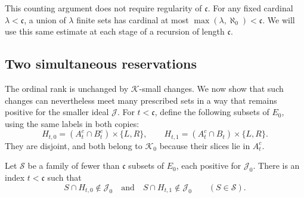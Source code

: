 This counting argument does not require regularity of
$\mathfrak c$. For any fixed cardinal $\lambda<\mathfrak c$, a union
of $\lambda$ finite sets has cardinal at most
$\max(\lambda,\aleph_0)<\mathfrak c$. We will use this same estimate
at each stage of a recursion of length $\mathfrak c$.

\subsection{Two simultaneous reservations}

The ordinal rank is unchanged by $\mathcal K$-small changes. We now
show that such changes can nevertheless meet many prescribed sets
in a way that remains positive for the smaller ideal $\mathcal J$.
For $t<\mathfrak c$, define the following subsets of $E_0$, using the
same labels in both copies:
\[
 H_{t,0}=(A_t^c\cap B_t^c)\times\{L,R\},\qquad
 H_{t,1}=(A_t^c\cap B_t)\times\{L,R\}.
\]
They are disjoint, and both belong to $\mathcal K_0$ because their
slices lie in $A_t^c$.

\begin{lemma}\label{lem:reservations}
Let $\mathscr S$ be a family of fewer than $\mathfrak c$ subsets of
$E_0$, each positive for $\mathcal J_0$. There is an index
$t<\mathfrak c$ such that
\[
 S\cap H_{t,0}\notin\mathcal J_0
 \quad\text{and}\quad
 S\cap H_{t,1}\notin\mathcal J_0
 \qquad(S\in\mathscr S).
\]
\end{lemma}

